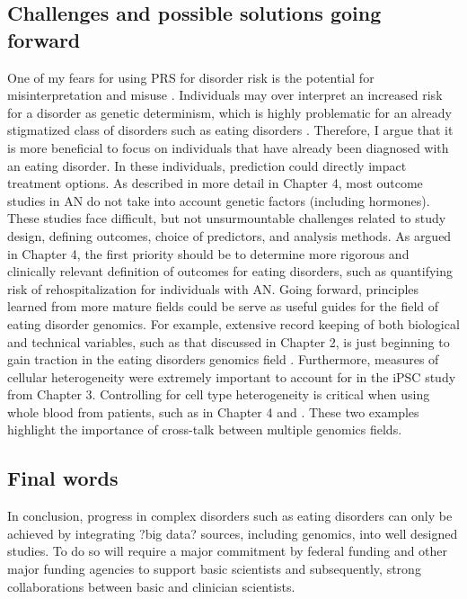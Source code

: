 \subsection{Challenges and possible solutions going forward}
One of my fears for using PRS for disorder risk is the potential for misinterpretation and misuse \cite{RN1127}. Individuals may over interpret an increased risk for a disorder as genetic determinism, which is highly problematic for an already stigmatized class of disorders such as eating disorders \cite{RN1175, RN4209, RN111, RN1137}. Therefore, I argue that it is more beneficial to focus on individuals that have already been diagnosed with an eating disorder. In these individuals, prediction could directly impact treatment options. 
As described in more detail in Chapter 4, most outcome studies in AN do not take into account genetic factors (including hormones). These studies face difficult, but not unsurmountable challenges related to study design, defining outcomes, choice of predictors, and analysis methods. As argued in Chapter 4, the first priority should be to determine more rigorous and clinically relevant definition of outcomes for eating disorders, such as quantifying risk of rehospitalization for individuals with AN. 
Going forward, principles learned from more mature fields could be serve as useful guides for the field of eating disorder genomics. For example, extensive record keeping of both biological and technical variables, such as that discussed in Chapter 2, is just beginning to gain traction in the eating disorders genomics field \cite{RN4569}. Furthermore, measures of cellular heterogeneity were extremely important to account for in the iPSC study from Chapter 3. Controlling for cell type heterogeneity is critical when using whole blood from patients, such as in Chapter 4 and \cite{RN1411}. These two examples highlight the importance of cross-talk between multiple genomics fields. 

\subsection{Final words}
In conclusion, progress in complex disorders such as eating disorders can only be achieved by integrating ?big data? sources, including genomics, into well designed studies. To do so will require a major commitment by federal funding and other major funding agencies to support basic scientists and subsequently, strong collaborations between basic and clinician scientists.

